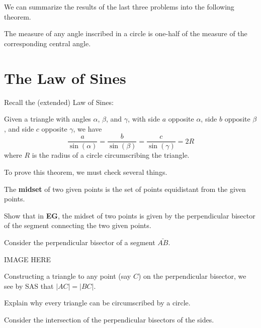 \documentclass{ximera}
\begin{document}
We can summarize the results of the last three problems into the following theorem.

\begin{theorem}
\label{43}The measure of any angle inscribed in a circle is one-half of the
measure of the corresponding central angle.
\end{theorem}




\section{The Law of Sines}


Recall the (extended) Law of Sines:

\begin{theorem}
Given a triangle with angles $\alpha$, $\beta$, and $\gamma$, with
side $a$ opposite $\alpha$, side $b$ opposite $\beta$, and side $c$
opposite $\gamma$, we have
\[
\frac{a}{\sin(\alpha)} = \frac{b}{\sin(\beta)} = \frac{c}{\sin(\gamma)} = 2R  
\]
where $R$ is the radius of a circle circumscribing the triangle.
\end{theorem}

To prove this theorem, we must check several things. 

\begin{definition}
The \textbf{midset} of two given points is the set of points
equidistant from the given points.
\end{definition}

\begin{problem}
Show that in \textbf{EG}, the midset of two points is given by the
perpendicular bisector of the segment connecting the two given points.
\begin{freeResponse}
Consider the perpendicular bisector of a segment $\bar{AB}$.
\begin{image}
IMAGE HERE
\end{image}
Constructing a triangle to any point (say $C$) on the perpendicular
bisector, we see by SAS that $|AC|=|BC|$.
\end{freeResponse}
\end{problem}


\begin{problem}
Explain why every triangle can be circumscribed by a circle.
\begin{hint}
Consider the intersection of the perpendicular bisectors of the sides.
\end{hint}
\end{problem}
\end{document}
